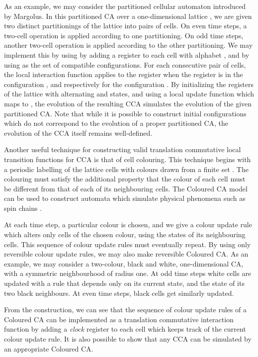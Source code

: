 \documentclass{jca}
\begin{document}
As an example, we may consider the partitioned cellular automaton introduced by Margolus\cite{cabook}.
In this partitioned CA over a one-dimensional lattice , we are given 
two distinct partitionings of the lattice into pairs of cells.
On even time steps, a two-cell operation  is applied according to one partitioning.
On odd time steps, another two-cell operation  is applied according to the other partitioning.
We may implement this by using by adding a register to each cell with alphabet , and by using  as the set of compatible configurations.
For each consecutive pair of cells, the local interaction function applies  to the  register when the  register is in the configuration , and  respectively for the configuration .
By initializing the  registers of the lattice with alternating  and  states, and using a local update function which maps  to , the evolution of the resulting CCA simulates the evolution of the given partitioned CA.
Note that while it is possible to construct initial configurations which do not correspond to the evolution of a proper partitioned CA, the evolution of the CCA itself remains well-defined.

Another useful technique for constructing valid translation commutative local transition functions for CCA is that of cell colouring.
This technique begins with a periodic labelling of the lattice cells with colours drawn from a finite set .
The colouring must satisfy the additional property that the colour of each cell must be different from that of each of its neighbouring cells.
The Coloured CA model can be used to construct automata which simulate physical phenomena such as spin chains \cite{lloyd93,benjamin1,cp07}.

At each time step, a particular colour is chosen, and we give a colour update rule which alters only cells of the chosen colour, using the states of its neighbouring cells.
This sequence of colour update rules must eventually repeat.
By using only reversible colour update rules, we may also make reversible Coloured CA.
As an example, we may consider a two-colour, black and white, one-dimensional CA, with a symmetric neighbourhood of radius one. 
At odd time steps white cells are updated with a rule that depends only on its current state, and the state of its two black neighbours.
At even time steps, black cells get similarly updated.

From the construction, we can see that the sequence of colour update rules of a Coloured CA can be implemented as a translation commutative interaction function by adding a \emph{clock} register to each cell which keeps track of the current colour update rule.
It is also possible to show that any CCA can be simulated by an appropriate Coloured CA.
\end{document}
